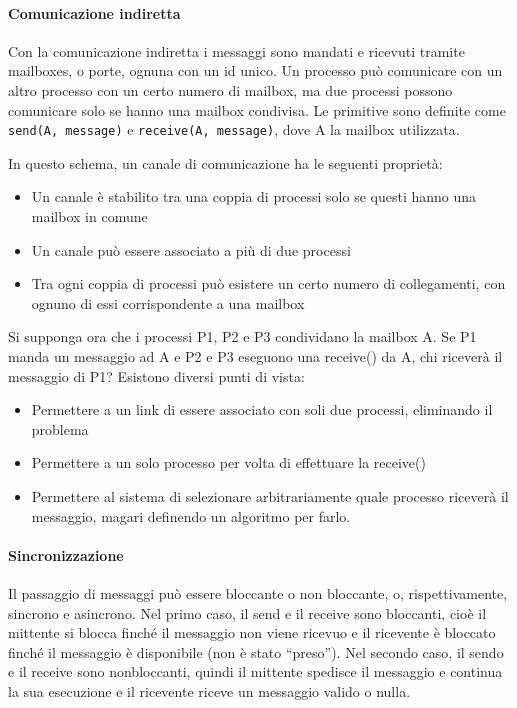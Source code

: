 \documentclass[a4paper]{article}
\begin{document}
\paragraph{Comunicazione indiretta}
Con la comunicazione indiretta i messaggi sono mandati e ricevuti tramite mailboxes, o porte, ognuna con un id unico. Un processo può comunicare con un altro processo con un certo numero di mailbox, ma due processi possono comunicare solo se hanno una mailbox condivisa. Le primitive sono definite come \texttt{send(A, message)} e \texttt{receive(A, message)}, dove A  la mailbox utilizzata.

In questo schema, un canale di comunicazione ha le seguenti proprietà:
\begin{itemize}
   \item Un canale è stabilito tra una coppia di processi solo se questi hanno una mailbox in comune
   \item Un canale può essere associato a più di due processi
   \item Tra ogni coppia di processi può esistere un certo numero di collegamenti, con ognuno di essi corrispondente a una mailbox
\end{itemize}

Si supponga ora che i processi P1, P2 e P3 condividano la mailbox A. Se P1 manda un messaggio ad A e P2 e P3 eseguono una receive() da A, chi riceverà il messaggio di P1? Esistono diversi punti di vista:
\begin{itemize}
   \item Permettere a un link di essere associato con soli due processi, eliminando il problema
   \item Permettere a un solo processo per volta di effettuare la receive()
   \item Permettere al sistema di selezionare arbitrariamente quale processo riceverà il messaggio, magari definendo un algoritmo per farlo.
\end{itemize}

\paragraph{Sincronizzazione}
Il passaggio di messaggi può essere bloccante o non bloccante, o, rispettivamente, sincrono e asincrono. Nel primo caso, il send e il receive sono bloccanti, cioè il mittente si blocca finché il messaggio non viene ricevuo e il ricevente è bloccato finché il messaggio è disponibile (non è stato ``preso''). Nel secondo caso, il sendo e il receive sono nonbloccanti, quindi il mittente spedisce il messaggio e continua la sua esecuzione e il ricevente riceve un messaggio valido o nulla.
\end{document}
